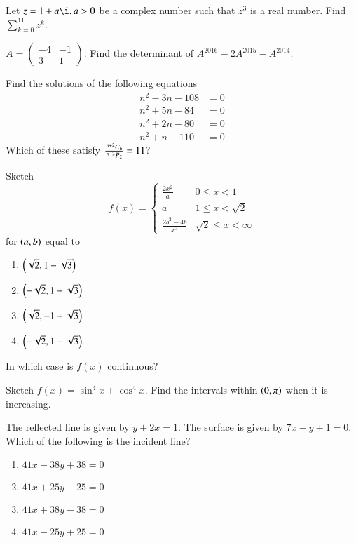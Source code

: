 \documentclass[journal,12pt,onecolumn]{IEEEtran}
\begin{document}
\begin{problem}
Let $z = 1 + a \i, a > 0$  be a complex number such that $z^3$ is a real number. Find $\sum_{k = 0}^{11}z^k$.
\end{problem}
\solution

\begin{problem}
$A = 
\begin{pmatrix}
-4 & -1 \\
3 & 1
\end{pmatrix}
$.
Find the determinant of $A^{2016}-2A^{2015}-A^{2014}$.
\end{problem}
\begin{problem}
Find the solutions of the following equations
\begin{align*}
n^2-3n-108 &= 0 \\
n^2 + 5n -84 &= 0 \\
n^2 + 2n - 80 &=0 \\
n^2+n-110 &= 0
\end{align*}
Which of these satisfy $\frac{\,^{n+2}C_{6}}{\,^{n-2}P_{2}} = 11$?
\end{problem}		
\begin{problem}
Sketch 
\begin{equation*}
f(x) = 
\begin{cases}
\frac{2x^2}{a} & 0 \leq x < 1\\
a & 1 \leq x < \sqrt{2} \\
\frac{2b^2 - 4b}{x^3} & \sqrt{2} \leq x < \infty
\end{cases}
\end{equation*}
for $\left(a,b\right)$ equal to 
\begin{enumerate}
\item $\left(\sqrt{2}, 1 - \sqrt{3}\right)$
\item $\left(-\sqrt{2}, 1 + \sqrt{3}\right)$
\item $\left(\sqrt{2},-1+\sqrt{3}\right)$
\item $\left(-\sqrt{2}, 1 - \sqrt{3}\right)$
\end{enumerate}
In which case is  $f(x)$ continuous?
\end{problem}
\solution

\begin{problem}
Sketch $f(x) = \sin^4x + \cos^4x$. Find the intervals within $\left(0,\pi\right)$ when it is increasing.
\end{problem}
\solution

\begin{problem}
The reflected line is given by $y+2x=1$. The surface is given by $7x-y+1=0$. Which of the following is the incident line?
\begin{enumerate}
\item $41x - 38y +38 = 0$
\item $41x +25y - 25 = 0$
\item $41x + 38y-38=0$
\item $41x-25y+25=0$
\end{enumerate}
\end{problem}
\end{document}
